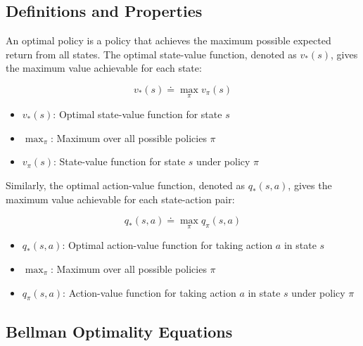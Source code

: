 \documentclass{article}
\begin{document}
\subsection{Definitions and Properties}

An optimal policy is a policy that achieves the maximum possible expected return from all states. The optimal state-value function, denoted as $v_*(s)$, gives the maximum value achievable for each state:

\begin{equation}
v_*(s) \doteq \max_\pi v_\pi(s)
\end{equation}

\begin{tcolorbox}[colframe=blue!50!black, colback=blue!10, title=Notation Overview]
\begin{itemize}
    \item $v_*(s)$: Optimal state-value function for state $s$
    \item $\max_\pi$: Maximum over all possible policies $\pi$
    \item $v_\pi(s)$: State-value function for state $s$ under policy $\pi$
\end{itemize}
\end{tcolorbox}

Similarly, the optimal action-value function, denoted as $q_*(s,a)$, gives the maximum value achievable for each state-action pair:

\begin{equation}
q_*(s,a) \doteq \max_\pi q_\pi(s,a)
\end{equation}

\begin{tcolorbox}[colframe=blue!50!black, colback=blue!10, title=Notation Overview]
\begin{itemize}
    \item $q_*(s,a)$: Optimal action-value function for taking action $a$ in state $s$
    \item $\max_\pi$: Maximum over all possible policies $\pi$
    \item $q_\pi(s,a)$: Action-value function for taking action $a$ in state $s$ under policy $\pi$
\end{itemize}
\end{tcolorbox}

\subsection{Bellman Optimality Equations}
\end{document}

